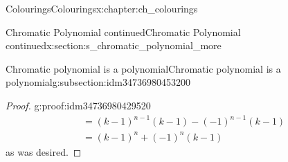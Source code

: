 \documentclass[oneside,10pt,]{book}
\numberwithin{equation}{section}
\newcommand{\amp}{&}
\begin{document}
\begin{chapterptx}{Colourings}{}{Colourings}{}{}{x:chapter:ch_colourings}
\begin{sectionptx}{Chromatic Polynomial continued}{}{Chromatic Polynomial continued}{}{}{x:section:s_chromatic_polynomial_more}
\begin{subsectionptx}{Chromatic polynomial is a polynomial}{}{Chromatic polynomial is a polynomial}{}{}{g:subsection:idm34736980453200}
\begin{proof}{}{g:proof:idm34736980429520}
\begin{align*}
\amp = (k-1)^{n-1}(k-1) - (-1)^{n-1}(k-1) \\
\amp = (k-1)^n+(-1)^n(k-1) 
\end{align*}
as was desired.%
\end{proof}
\end{subsectionptx}
\end{sectionptx}
\end{chapterptx}
\end{document}
